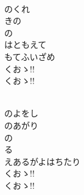 \documentclass[10pt,b5j]{tarticle} %
\begin{document}
\vspace{1.5em} %
\newcommand{\linespace}{0.5em} %
\newcommand{\blocksize}{0.5\hsize} %
\newcommand{\itemmargin}{3em} %
\begin{enumerate} %
    \setlength{\itemindent}{\itemmargin} %
    \begin{minipage}[c]{\blocksize}
    
        \vspace{\linespace}
        \item~\\
        のくれ\\
        きの\\
        の\\
        はともえて\\
        もてふいざめ\\
        くおゝ!!\\
        くおゝ!!
        
    \end{minipage}
    \begin{minipage}[c]{\blocksize}
        
        \vspace{\linespace}
        \item~\\
        のよをし\\
        のあがり\\
        の\\
        る\\
        えあるがよはちたり\\
        くおゝ!!\\
        くおゝ!!
    
    \end{minipage}
\end{enumerate} %
\end{document}
